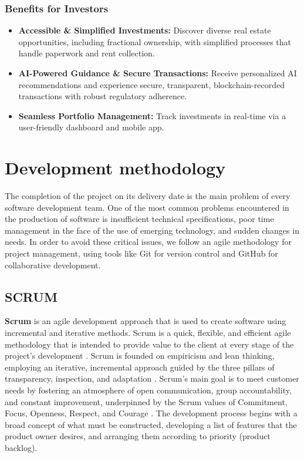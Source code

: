 \subsubsection*{Benefits for Investors}
\begin{itemize}
    \item \textbf{Accessible \& Simplified Investments:} Discover diverse real estate opportunities, including fractional ownership, with simplified processes that handle paperwork and rent collection.
    \item \textbf{AI-Powered Guidance \& Secure Transactions:} Receive personalized AI recommendations and experience secure, transparent, blockchain-recorded transactions with robust regulatory adherence.
    \item \textbf{Seamless Portfolio Management:} Track investments in real-time via a user-friendly dashboard and mobile app.
\end{itemize}


\section{Development methodology}

The completion of the project on its delivery date is the main problem of every software development team. One of the most common problems encountered in the production of software is insufficient technical specifications, poor time management in the face of the use of emerging technology, and sudden changes in needs. In order to avoid these critical issues, we follow an agile methodology for project management, using tools like Git \cite{GitWebsite} for version control and GitHub \cite{GithubWebsite} for collaborative development.

\subsection{SCRUM}

\textbf{\textcolor{primary}{Scrum}} is an agile development approach that is used to create software using incremental and iterative methods. Scrum is a quick, flexible, and efficient agile methodology that is intended to provide value to the client at every stage of the project's development \cite{ScrumGuide2020}. Scrum is founded on empiricism and lean thinking, employing an iterative, incremental approach guided by the three pillars of transparency, inspection, and adaptation \cite{AtlassianScrumPillars, ScrumGuide2020}. Scrum's main goal is to meet customer needs by fostering an atmosphere of open communication, group accountability, and constant improvement, underpinned by the Scrum values of Commitment, Focus, Openness, Respect, and Courage \cite{ScrumGuide2020}. The development process begins with a broad concept of what must be constructed, developing a list of features that the product owner desires, and arranging them according to priority (product backlog).

